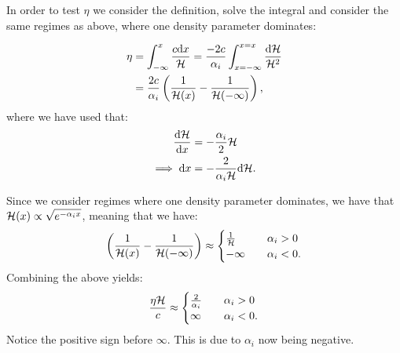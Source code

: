     In order to test $\eta$ we consider the definition, solve the integral and consider the same regimes as above, where one density parameter dominates:

    \begin{equation}
        \begin{split}
            \eta &= \int_{-\infty}^x \frac{c\mathrm{d} x}{\mathcal{H}} = \frac{-2c}{\alpha_i}\int_{x=-\infty}^{x=x}\frac{\mathrm{d}\mathcal{H}}{\mathcal{H}^2} \\
            &= \frac{2c}{\alpha_i}\left(\frac{1}{\mathcal{H}(x)}-\frac{1}{\mathcal{H}(-\infty)}\right),
        \end{split}
    \end{equation}
    where we have used that:
    \begin{equation}
        \begin{split}
            \dv{\mathcal{H}}{x} &= -\frac{\alpha_i}{2}\mathcal{H} \\
            \implies \mathrm{d} x &= -\frac{2}{\alpha_i\mathcal{H}}\mathrm{d}\mathcal{H}.
        \end{split}
    \end{equation}
    
    Since we consider regimes where one density parameter dominates, we have that $\mathcal{H}(x)\propto \sqrt{e^{-\alpha_ix}}$, meaning that we have:
    \begin{equation}
        \left(\frac{1}{\mathcal{H}(x)}-\frac{1}{\mathcal{H}(-\infty)}\right) \approx 
        \begin{cases}
            \frac{1}{\mathcal{H}} \quad &\alpha_i>0 \\
            -\infty \quad &\alpha_i <0.
        \end{cases}
    \end{equation}
    Combining the above yields:
    \begin{equation}
        \frac{\eta\mathcal{H}}{c} \approx 
        \begin{cases}
            \frac{2}{\alpha_i} \quad &\alpha_i>0 \\
            \infty \quad &\alpha_i<0.
        \end{cases}
    \end{equation}
    Notice the positive sign before $\infty$. This is due to $\alpha_i$ now being negative. 
    
